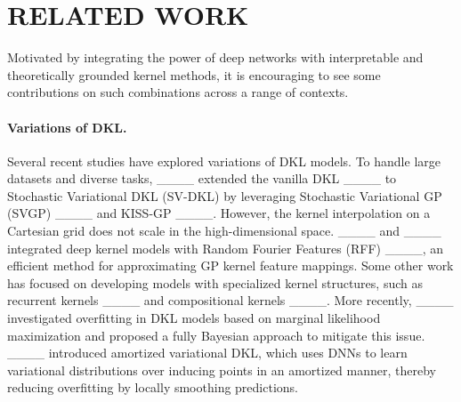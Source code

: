 \section{RELATED WORK}
\label{sec:related work}
Motivated by integrating the power of deep networks with interpretable and theoretically grounded kernel methods, it is encouraging to see some contributions on such combinations across a range of contexts.

\paragraph{Variations of DKL.} 
Several recent studies have explored variations of DKL models. To handle large datasets and diverse tasks, ____ extended the vanilla DKL ____ to Stochastic Variational DKL (SV-DKL) by leveraging Stochastic Variational GP (SVGP) ____ and KISS-GP ____. However, the kernel interpolation on a Cartesian grid does not scale in the high-dimensional space. ____ and ____ integrated deep kernel models with Random Fourier Features (RFF) ____, an efficient method for approximating GP kernel feature mappings. Some other work has focused on developing models with specialized kernel structures, such as recurrent kernels ____ and compositional kernels ____. More recently, %
____ investigated overfitting in DKL models based on marginal likelihood maximization and proposed a fully Bayesian approach to mitigate this issue. ____ introduced amortized variational DKL, which uses DNNs to learn variational distributions over inducing points in an amortized manner, thereby reducing overfitting by locally smoothing predictions. 


